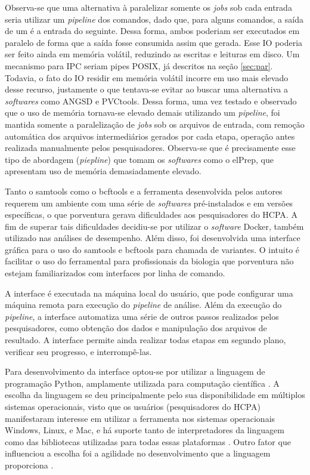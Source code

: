 \documentclass[cic,tc]{iiufrgs}
\begin{document}
Observa-se que uma alternativa à paralelizar somente os \textit{jobs} sob cada
entrada seria utilizar um \textit{pipeline} dos comandos, dado que, para alguns
comandos, a saída de um é a entrada do seguinte. Dessa forma, ambos poderiam
ser executados em paralelo de forma que a saída fosse consumida assim que
gerada. Esse IO poderia ser feito ainda em memória volátil, reduzindo as
escritas e leituras em disco. Um mecanismo para IPC seriam pipes POSIX, já
descritos na seção \ref{sec:par}. Todavia, o fato do IO residir em memória
volátil incorre em uso mais elevado desse recurso, justamente o que tentava-se
evitar ao buscar uma alternativa a \textit{softwares} como ANGSD e PVCtools.
Dessa forma, uma vez testado e observado que o uso de memória tornava-se
elevado demais utilizando um \textit{pipeline}, foi mantida somente a
paralelização de \textit{jobs} sob os arquivos de entrada, com remoção
automática dos arquivos intermediários gerados por cada etapa, operação antes
realizada manualmente pelos pesquisadores. Observa-se que é precisamente esse
tipo de abordagem (\textit{piepline}) que tomam os \textit{softwares} como o
elPrep, que apresentam uso de memória demasiadamente elevado.

Tanto o samtools como o bcftools e a ferramenta desenvolvida pelos autores
requerem um ambiente com uma série de \textit{softwares} pré-instalados e em versões
específicas, o que porventura gerava dificuldades aos pesquisadores do HCPA. A
fim de superar tais dificuldades decidiu-se por utilizar o \textit{software} Docker,
também utilizado nas análises de desempenho. Além disso, foi desenvolvida uma
interface gráfica para o uso do samtools e bcftools para chamada de variantes.
O intuito é facilitar o uso do ferramental para profissionais da biologia que
porventura não estejam familiarizados com interfaces por linha de comando.

A interface é executada na máquina local do usuário, que pode configurar uma
máquina remota para execução do \textit{pipeline} de análise. Além da execução do
\textit{pipeline}, a interface automatiza uma série de outros passos realizados pelos
pesquisadores, como obtenção dos dados e manipulação dos arquivos de resultado.
A interface permite ainda realizar todas etapas em segundo plano, verificar seu
progresso, e interrompê-las.

Para desenvolvimento da interface optou-se por utilizar a linguagem de
programação Python, amplamente utilizada para computação
científica \cite{oliphant2007python}. A escolha da linguagem se deu
principalmente pelo sua disponibilidade em múltiplos sistemas operacionais,
visto que os usuários (pesquisadores do HCPA) manifestaram interesse em
utilizar a ferramenta nos sistemas operacionais Windows, Linux, e Mac, e há
suporte tanto de interpretadores da linguagem como das bibliotecas utilizadas
para todas essas plataformas \cite{oliphant2007python}. Outro fator que
influenciou a escolha foi a agilidade no desenvolvimento que a linguagem
proporciona \cite{oliphant2007python}.
\end{document}
